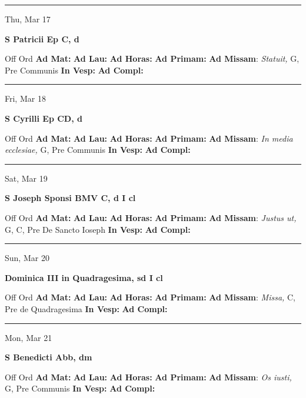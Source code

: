 \documentclass[letterpaper, 10pt]{article}
\begin{document}
\hrule
\begin{center}
Thu, Mar 17
\end{center}\textbf{ \large S Patricii Ep C, \textnormal{\normalsize d}}
\begin{justify}
Off Ord
\textbf{Ad Mat: }
\textbf{Ad Lau: }
\textbf{Ad Horas: }
\textbf{Ad Primam: }
\textbf{Ad Missam}: \textit{Statuit,} G, Pre Communis
\textbf{In Vesp: }
\textbf{Ad Compl: }\end{justify}



\hrule
\begin{center}
Fri, Mar 18
\end{center}\textbf{ \large S Cyrilli Ep CD, \textnormal{\normalsize d}}
\begin{justify}
Off Ord
\textbf{Ad Mat: }
\textbf{Ad Lau: }
\textbf{Ad Horas: }
\textbf{Ad Primam: }
\textbf{Ad Missam}: \textit{In media ecclesiae,} G, Pre Communis
\textbf{In Vesp: }
\textbf{Ad Compl: }\end{justify}



\hrule
\begin{center}
Sat, Mar 19
\end{center}\textbf{ \large S Joseph Sponsi BMV C, \textnormal{\normalsize d I cl}}
\begin{justify}
Off Ord
\textbf{Ad Mat: }
\textbf{Ad Lau: }
\textbf{Ad Horas: }
\textbf{Ad Primam: }
\textbf{Ad Missam}: \textit{Justus ut,} G, C, Pre De Sancto Ioseph
\textbf{In Vesp: }
\textbf{Ad Compl: }\end{justify}



\hrule
\begin{center}
Sun, Mar 20
\end{center}\textbf{ \large Dominica III in Quadragesima, \textnormal{\normalsize sd I cl}}
\begin{justify}
Off Ord
\textbf{Ad Mat: }
\textbf{Ad Lau: }
\textbf{Ad Horas: }
\textbf{Ad Primam: }
\textbf{Ad Missam}: \textit{Missa,} C, Pre de Quadragesima
\textbf{In Vesp: }
\textbf{Ad Compl: }\end{justify}



\hrule
\begin{center}
Mon, Mar 21
\end{center}\textbf{ \large S Benedicti Abb, \textnormal{\normalsize dm}}
\begin{justify}
Off Ord
\textbf{Ad Mat: }
\textbf{Ad Lau: }
\textbf{Ad Horas: }
\textbf{Ad Primam: }
\textbf{Ad Missam}: \textit{Os iusti,} G, Pre Communis
\textbf{In Vesp: }
\textbf{Ad Compl: }\end{justify}
\end{document}
